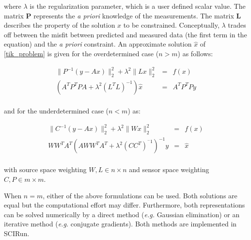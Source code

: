 \documentclass[fleqn,11pt,openany]{book}
\begin{document}
\noindent where $\lambda$ is the regularization parameter, which is a user defined scalar value. The matrix $\mathbf{P}$ represents the \textit{a priori} knowledge of the measurements. The matrix $\mathbf{L}$ describes the property of the solution $x$ to be constrained.
Conceptually, $\lambda$ trades off between the misfit between predicted and measured data (the first term in the equation) and the \textit{a priori} constraint.
An approximate solution $\hat{x}$ of \ref{tik_problem} is given for the
overdetermined case ($n > m$) as follows:
\begin{center}
\begin{eqnarray}
    \| P^{-1} (y - A x) \|^{2}_{2} + \lambda^{2} \| L x \|^{2}_{2} &=& f(x)
\nonumber \\
    (A^{T} P^{T} P A + \lambda^{2} (L^{T} L)^{-1}) \hat{x} &=& A^{T} P^{T} P
y \\
\label{tik_problem_overdet}
\end{eqnarray}
\end{center}

\noindent and for the underdetermined case ($n < m$) as:

\begin{center}
\begin{eqnarray}
   \| C^{-1} (y - A x) \|^{2}_{2} + \lambda^{2} \| Wx \|^{2}_{2} &=& f(x)
\nonumber\\
   W {W}^{T} A^{T} (A W {W}^{T} A^{T} + \lambda^{2} (C
C^{T})^{^-1})^{-1} y &=& \hat{x} \\
\label{tik_problem_underdet}
\end{eqnarray}
\end{center}
\noindent with source space weighting $ W,L \in n \times n $ and sensor space
weighting $ C,P \in m \times m $. 

When $n=m$, either of the above formulations can be used. 
Both solutions are equal but the computational effort may differ. Furthermore, both representations can be solved numerically by a direct method (\textit{e.g.} Gaussian elimination) or an iterative method (\textit{e.g.} conjugate gradients). Both methods are implemented in SCIRun.
\end{document}
